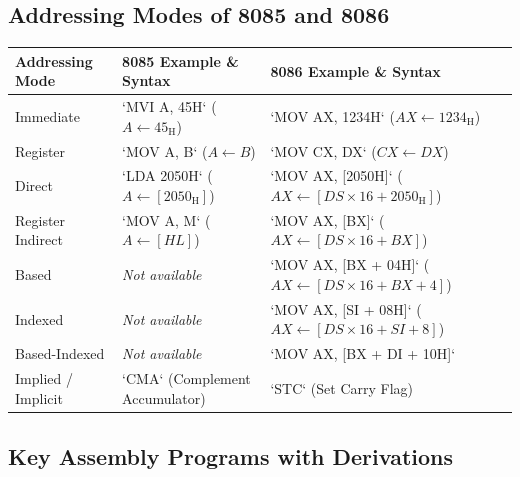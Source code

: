 \documentclass[12pt,a4paper]{article}
\begin{document}
\subsection{Addressing Modes of 8085 and 8086}
\par\vspace{6pt}\noindent
\begingroup
\setlength{\extrarowheight}{2.5pt}
\noindent\begin{tabularx}{\linewidth}{|B{3.2cm}|B{3.4cm}|Y|}
\hline
\textbf{Addressing Mode} & \textbf{8085 Example \& Syntax} & \textbf{8086 Example \& Syntax} \\ \hline
Immediate & `MVI A, 45H` ($A \leftarrow 45_{\mathrm{H}}$) & `MOV AX, 1234H` ($AX \leftarrow 1234_{\mathrm{H}}$) \\ \hline
Register & `MOV A, B` ($A \leftarrow B$) & `MOV CX, DX` ($CX \leftarrow DX$) \\ \hline
Direct & `LDA 2050H` ($A \leftarrow [2050_{\mathrm{H}}]$) & `MOV AX, [2050H]` ($AX \leftarrow [DS \times 16 + 2050_{\mathrm{H}}]$) \\ \hline
Register Indirect & `MOV A, M` ($A \leftarrow [HL]$) & `MOV AX, [BX]` ($AX \leftarrow [DS \times 16 + BX]$) \\ \hline
Based & \textit{Not available} & `MOV AX, [BX + 04H]` ($AX \leftarrow [DS \times 16 + BX + 4]$) \\ \hline
Indexed & \textit{Not available} & `MOV AX, [SI + 08H]` ($AX \leftarrow [DS \times 16 + SI + 8]$) \\ \hline
Based-Indexed & \textit{Not available} & `MOV AX, [BX + DI + 10H]` \\ \hline
Implied / Implicit & `CMA` (Complement Accumulator) & `STC` (Set Carry Flag) \\ \hline
\end{tabularx}\par
\endgroup

\subsection{Key Assembly Programs with Derivations}
\end{document}
